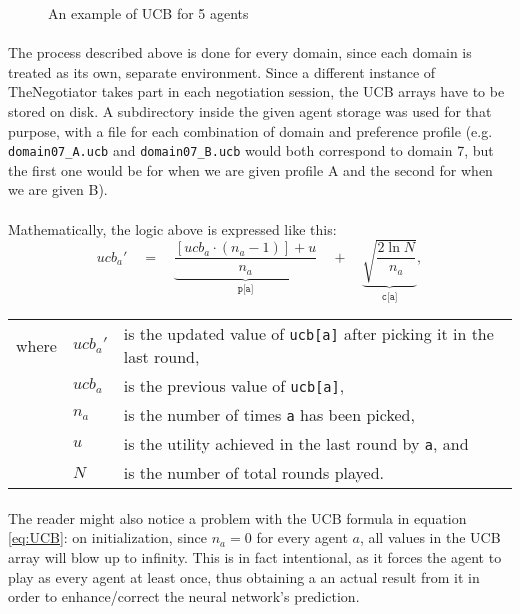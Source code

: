 \begin{figure}[H]
    \centering
    \captionsetup{justification=centering}
    \caption{An example of UCB for 5 agents}
    \label{fig:UCB_example}
\end{figure}

\paragraph*{}
The process described above is done for every domain, since each domain is treated as its own, separate environment. Since a different instance of TheNegotiator takes part in each negotiation session, the UCB arrays have to be stored on disk. A subdirectory inside the given agent storage was used for that purpose, with a file for each combination of domain and preference profile (e.g. \texttt{domain07\_A.ucb} and  \texttt{domain07\_B.ucb} would both correspond to domain 7, but the first one would be for when we are given profile A and the second for when we are given B).

\paragraph*{}
Mathematically, the logic above is expressed like this:
\begin{equation} \label{eq:UCB}
    {ucb_{a}}' \quad = \quad \underbrace{\frac{[ucb_{a} \cdot (n_{a}-1)]+u}{n_{a}}}_{\texttt{p[a]}} \quad + \quad \underbrace{\sqrt{\frac{2 \ln N}{n_{a}}}}_{\texttt{c[a]}},
\end{equation}
\vspace{-0.5cm}		%
\renewcommand{\arraystretch}{1} %
\begin{longtable}{l l l}
    where 	& ${ucb_{a}}'$	& is the updated value of \texttt{ucb[a]} after picking it in the last round, \\
            & $ucb_{a}$  	& is the previous value of \texttt{ucb[a]}, \\
            & $n_{a}$ 		& is the number of times \texttt{a} has been picked, \\
            & $u$ 			& is the utility achieved in the last round by \texttt{a}, and \\
            & $N$ 		& is the number of total rounds played. \\
\end{longtable}

\paragraph*{}
The reader might also notice a problem with the UCB formula in equation \ref{eq:UCB}: on initialization, since $n_{a}=0$ for every agent $a$, all values in the UCB array will blow up to infinity. This is in fact intentional, as it forces the agent to play as every agent at least once, thus obtaining a an actual result from it in order to enhance/correct the neural network's prediction.
